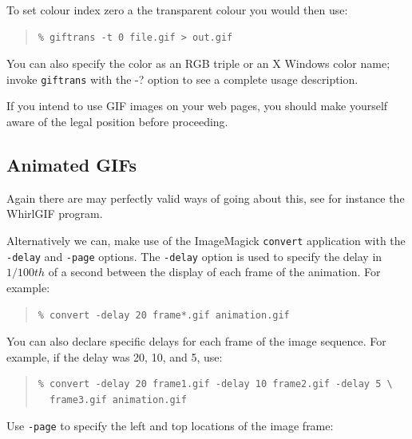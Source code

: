 \documentclass[twoside,11pt]{article}
\newcommand{\htmlref}[2]{#1}
\newcommand{\xlabel}[1]{}
\begin{document}
To set colour index zero a the transparent colour you would then use:

\small
\begin{quote}
\begin{verbatim}
% giftrans -t 0 file.gif > out.gif
\end{verbatim}
\end{quote}
\normalsize

You can also specify the color as an RGB triple or an X Windows color name; invoke {\tt giftrans} with the -? option to see a complete usage description. 

If you intend to use GIF images on your web pages, you should make yourself aware of the \htmlref{legal position}{sc15_giflegal} before proceeding. 

\subsection{\xlabel{sc15_animated}Animated GIFs\label{sc15_animated}}

Again there are may perfectly valid ways of going about this, see for instance the \htmlref{WhirlGIF}{sc15_whirlgif} program.

Alternatively we can, make use of the \htmlref{ImageMagick}{sc15_magick} {\tt convert} application with the {\tt -delay} and {\tt -page} options. The {\tt -delay} option is used to specify the delay in $1/100 th$  of a second between the display of each frame of the animation. For example:

\small
\begin{quote}
\begin{verbatim}
% convert -delay 20 frame*.gif animation.gif
\end{verbatim}
\end{quote}
\normalsize

You can also declare specific delays for each frame of the image sequence. For example, if the delay was 20, 10, and 5, use:

\small
\begin{quote}
\begin{verbatim}
% convert -delay 20 frame1.gif -delay 10 frame2.gif -delay 5 \
  frame3.gif animation.gif
\end{verbatim}
\end{quote}
\normalsize

Use {\tt -page} to specify the left and top locations of the image frame: 
\end{document}
